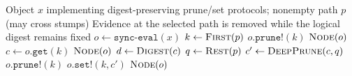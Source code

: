 \begin{algorithm}[htbp]
\caption{Deep Prune Along Object Path}
\label{alg:deep-prune}
\begin{algorithmic}[1]
\Require Object $x$ implementing digest-preserving prune/set protocols; nonempty path $p$ (may cross stumps)
\Ensure Evidence at the selected path is removed while the logical digest remains fixed
  \State $o \gets \texttt{sync-eval}(x)$
  \State $k \gets \Call{First}{p}$
    \State $o.\texttt{prune!}(k)$
    \State \Return $\Call{Node}{o}$
  \EndIf
  \State $c \gets o.\texttt{get}(k)$
    \State \Return $\Call{Node}{o}$
  \EndIf
  \State $d \gets \Call{Digest}{c}$
  \State $q \gets \Call{Rest}{p}$
  \State $c' \gets \Call{DeepPrune}{c,q}$
    \State {}
  \EndIf
    \State $o.\texttt{prune!}(k)$
  \Else
    \State $o.\texttt{set!}(k,c')$
  \EndIf
  \State \Return $\Call{Node}{o}$
\EndFunction
\end{algorithmic}
\end{algorithm}

